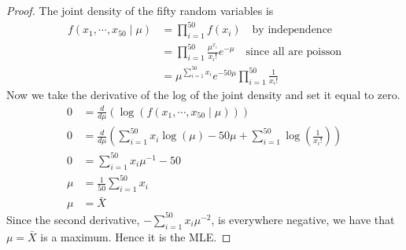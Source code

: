 \documentclass[letterpaper, 12pt]{article}
\newcommand{\sbs}{\;|\;} %
\begin{document}
\begin{enumerate}
\begin{enumerate}[(i)]
\begin{proof}
The joint density of the fifty random variables is 
\begin{align}
f(x_1, \cdots, x_{50} \sbs \mu) 
&= 
\prod_{i=1}^{50} 
f(x_i) 
\quad \text{by independence} \\
&= 
\prod_{i=1}^{50}
\frac{\mu^{x_i}}{x_i!} e^{-\mu}
\quad \text{since all are poisson} \\
&= 
\mu^{\sum_{i=1}^{50} x_i} e ^{-50\mu} 
\prod_{i=1}^{50}
\frac{1}{x_i!}
\end{align}
Now we take the derivative of the log of the joint density and set it equal to zero.
\begin{align}
0 &= \frac{d}{d \mu}(\log (  f(x_1, \cdots, x_{50} \sbs \mu)   )) \\
0 &= 
\frac{d}{d \mu} 
\left(\sum_{i=1}^{50} x_i \log(\mu) - 50 \mu + \sum_{i=1}^{50} \log\left(\frac{1}{x_i!} \right)    \right) \\
0 &=
\sum_{i=1}^{50} x_i \mu^{-1} - 50 \\
\mu &= \frac{1}{50}\sum_{i=1}^{50} x_i \\
\mu &= \bar{X}
\end{align}
Since the second derivative, $-\sum_{i=1}^{50} x_i \mu^{-2}$, is everywhere negative, we have that $\mu = \bar{X}$ is a maximum. Hence it is the MLE.


\end{proof}
\end{enumerate}
\end{enumerate}
\end{document}
